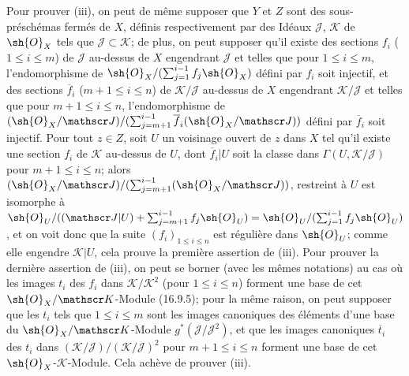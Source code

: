 Pour prouver (iii), on peut de même supposer que $Y$ et $Z$ sont des sous-préschémas fermés de $X$, définis respectivement par des Idéaux $\mathscr J$, $\mathscr K$ de $\sh{O}_X$ tels que $\mathscr J\subset\mathscr K$; de plus, on peut supposer qu'il existe des sections $f_i$ ($1\leq i\leq m$) de $\mathscr J$ au-dessus de $X$ engendrant $\mathscr J$ et telles que pour $1\leq i\leq m$, l'endomorphisme de $\sh{O}_X/(\sum_{j=1}^{i-1}f_j\sh{O}_X)$ défini par $f_i$ soit injectif, et des sections $\overline f_i$ ($m+1\leq i\leq n$) de $\mathscr K/\mathscr J$ au-dessus de $X$ engendrant $\mathscr K/\mathscr J$ et telles que pour $m+1\leq i\leq n$, l'endomorphisme de $(\sh{O}_X/\mathscr J)/(\sum_{j=m+1}^{i-1}\overline f_i(\sh{O}_X/\mathscr J))$ défini par $\overline f_i$ soit injectif. Pour tout $z\in Z$, soit $U$ un voisinage ouvert de $z$ dans $X$ tel qu'il existe une section $f_i$ de $\mathscr K$ au-dessus de $U$, dont $\overline f_i|U$ soit la classe dans $\Gamma(U,\mathscr K/\mathscr J)$ pour $m+1\leq i\leq n$; alors $(\sh{O}_X/\mathscr J)/(\sum_{j=m+1}^{i-1}(\sh{O}_X/\mathscr J))$, restreint à $U$ est isomorphe à $\sh{O}_U/((\mathscr J|U)+\sum_{j=m+1}^{i-1}f_j\sh{O}_U)=\sh{O}_U/(\sum_{j=1}^{i-1}f_j\sh{O}_U)$, et on voit donc que la suite $(f_i)_{1\leq i\leq n}$ est régulière dans $\sh{O}_U$; comme elle engendre $\mathscr K|U$, cela prouve la première assertion de (iii). Pour prouver la dernière assertion de (iii), on peut se borner (avec les mêmes notations) au cas où les images $t_i$ des $f_i$ dans $\mathscr K/\mathscr K^2$ (pour $1\leq i\leq n$) forment une base de cet $\sh{O}_X/\mathscr K$-Module (16.9.5); pour la même raison, on peut supposer que les $t_i$ tels que $1\leq i\leq m$ sont les images canoniques des éléments d'une base du $\sh{O}_X/\mathscr K$-Module $g^*(\mathscr J/\mathscr J^2)$, et que les images canoniques $\overline t_i$ des $t_i$ dans $(\mathscr K/\mathscr J)/(\mathscr K/\mathscr J)^2$ pour $m+1\leq i\leq n$ forment une base de cet $\sh{O}_X$-$\mathscr K$-Module. Cela achève de prouver (iii).

